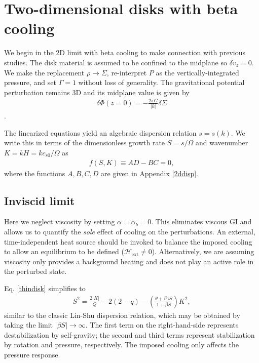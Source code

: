 \section{Two-dimensional disks with beta cooling}\label{result_2d}
We begin in the 2D limit with beta cooling  to make connection 
with previous studies. The disk
material is assumed to be confined to the midplane so $\delta v_z=0$. 
We make the replacement  
$\rho \to \Sigma$, re-interpret $P$ as the vertically-integrated
pressure, and set $\Gamma=1$ without loss of generality. 
The gravitational potential perturbation remains 3D and its midplane
value is given by    
\begin{align}
  \delta \Phi(z=0) = -\frac{2 \pi G}{|k|}\delta\Sigma
\end{align}
\citep{shu70}.
 
The linearized equations yield an algebraic dispersion relation $s =
s(k)$. We write this  
in terms of the dimensionless growth rate $S = s/\Omega$ and
wavenumber $K=kH = k c_{s0}/\Omega$ as
\begin{align}\label{thindisk}
  f(S,K)\equiv AD - BC = 0,   
\end{align}
where the functions $A,B,C,D$ are given in Appendix \ref{2ddisp}. 

\subsection{Inviscid limit}\label{2d_inviscid}
Here we neglect viscosity by setting 
$\alpha = \alpha_b = 0$. This eliminates viscous GI and 
allows us to quantify the \emph{sole} effect of cooling on the
perturbations. An external, time-independent heat source should be
invoked to balance the imposed cooling to allow an equilibrium to be
defined ($\mathcal{H}_\mathrm{ext}\neq 0$). Alternatively, we are
assuming viscosity only provides a background heating and does not
play an active role in the perturbed state. %

Eq. \ref{thindisk} simplifies to  
\begin{align}\label{inviscid}
  S^2 = \frac{2|K|}{Q} - 2(2-q) - \left(\frac{\theta + \beta \gamma
    S}{1+\beta S}\right)K^2, 
\end{align}
similar to the classic Lin-Shu dispersion relation, which may be
obtained by taking the limit $|\beta S|\to\infty$. 
The first term on
the right-hand-side represents destabilization by self-gravity; 
the second and third terms represent stabilization by rotation and
pressure, respectively. The imposed cooling only affects the
pressure response. 

